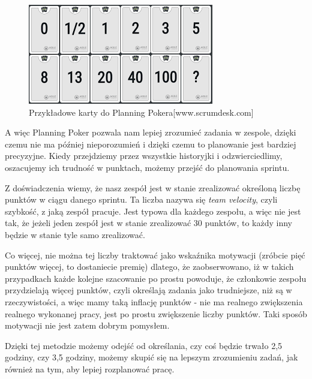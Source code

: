 \begin{figure}[H]
	\centering\includegraphics[width=\textwidth]{img/PlanningPokerCards}
	\caption{Przykładowe karty do Planning Pokera[www.scrumdesk.com]}\label{rysunek:poker}
\end{figure}

A więc Planning Poker pozwala nam lepiej zrozumieć zadania w zespole,
dzięki czemu nie ma później nieporozumień i dzięki czemu to planowanie jest bardziej precyzyjne.
Kiedy przejdziemy przez wszystkie historyjki i odzwierciedlimy, oszacujemy ich trudność w punktach,
możemy przejść do planowania sprintu.

Z doświadczenia wiemy, że nasz zespół jest w stanie zrealizować określoną liczbę punktów w ciągu danego sprintu.
Ta liczba nazywa się \textit{team velocity}, czyli szybkość, z jaką zespół pracuje.
Jest typowa dla każdego zespołu, a więc nie jest tak, że jeżeli jeden zespół
jest w stanie zrealizować 30 punktów, to każdy inny będzie w stanie tyle samo zrealizować.

Co więcej, nie można tej liczby traktować jako wskaźnika motywacji
(zróbcie pięć punktów więcej, to dostaniecie premię) dlatego,
że zaobserwowano, iż w takich przypadkach każde kolejne szacowanie po prostu powoduje,
że członkowie zespołu przydzielają więcej punktów, czyli określają zadania jako trudniejsze,
niż są w rzeczywistości, a więc mamy taką inflację punktów - nie ma realnego
zwiększenia realnego wykonanej pracy, jest po prostu zwiększenie liczby punktów.
Taki sposób motywacji nie jest zatem dobrym pomysłem.

Dzięki tej metodzie możemy odejść od określania, czy coś będzie trwało 2,5 godziny,
czy 3,5 godziny, możemy skupić się na lepszym zrozumieniu zadań,
jak również na tym, aby lepiej rozplanować pracę.
